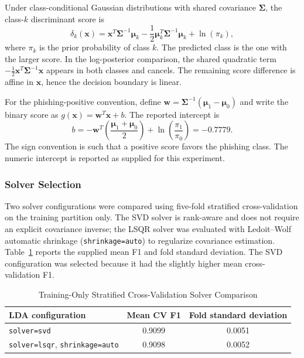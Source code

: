 \documentclass[conference]{IEEEtran}
\begin{document}
Under class-conditional Gaussian distributions with shared covariance $\boldsymbol{\Sigma}$, the class-$k$ discriminant score is
\begin{equation}
 \delta_k(\mathbf{x}) = \mathbf{x}^T\boldsymbol{\Sigma}^{-1}\boldsymbol{\mu}_k
 -\frac{1}{2}\boldsymbol{\mu}_k^T\boldsymbol{\Sigma}^{-1}\boldsymbol{\mu}_k
 +\ln(\pi_k),
 \label{eq:lda-score}
\end{equation}
where $\pi_k$ is the prior probability of class $k$. The predicted class is the one with the larger score. In the log-posterior comparison, the shared quadratic term $-\tfrac{1}{2}\mathbf{x}^T\boldsymbol{\Sigma}^{-1}\mathbf{x}$ appears in both classes and cancels. The remaining score difference is affine in $\mathbf{x}$, hence the decision boundary is linear.

For the phishing-positive convention, define $\mathbf{w}=\boldsymbol{\Sigma}^{-1}(\boldsymbol{\mu}_1-\boldsymbol{\mu}_0)$ and write the binary score as $g(\mathbf{x})=\mathbf{w}^T\mathbf{x}+b$. The reported intercept is
\begin{equation}
 b=-\mathbf{w}^T\left(\frac{\boldsymbol{\mu}_1+\boldsymbol{\mu}_0}{2}\right)
 +\ln\left(\frac{\pi_1}{\pi_0}\right)=-0.7779.
 \label{eq:lda-intercept}
\end{equation}
The sign convention is such that a positive score favors the phishing class. The numeric intercept is reported as supplied for this experiment.

\subsubsection{Solver Selection}
Two solver configurations were compared using five-fold stratified cross-validation on the training partition only. The SVD solver is rank-aware and does not require an explicit covariance inverse; the LSQR solver was evaluated with Ledoit--Wolf automatic shrinkage (\texttt{shrinkage=auto}) to regularize covariance estimation. Table~\ref{tab:solver-cv} reports the supplied mean F1 and fold standard deviation. The SVD configuration was selected because it had the slightly higher mean cross-validation F1.

\begin{table}[!t]
\caption{Training-Only Stratified Cross-Validation Solver Comparison}
\label{tab:solver-cv}
\centering
\footnotesize
\begin{tabular}{lcc}
\toprule
\textbf{LDA configuration} & \textbf{Mean CV F1} & \textbf{Fold standard deviation}\\
\midrule
\texttt{solver=svd} & 0.9099 & 0.0051\\
\texttt{solver=lsqr}, \texttt{shrinkage=auto} & 0.9098 & 0.0052\\
\bottomrule
\end{tabular}
\end{table}
\end{document}
